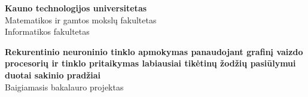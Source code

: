 

\begin{titlepage}
  \begin{center}


    \begin{figure}[H]
      \centering
    \end{figure}

    \vspace*{30pt}

    \fontXII
    \textbf{Kauno technologijos universitetas}\\
    Matematikos ir gamtos mokslų fakultetas\\
    Informatikos fakultetas

    \vspace*{80pt}

    \fontXVIII
	   \textbf{Rekurentinio neuroninio tinklo apmokymas panaudojant grafinį vaizdo procesorių ir tinklo pritaikymas labiausiai tikėtinų žodžių pasiūlymui duotai sakinio pradžiai}\\
     \fontXIV
     Baigiamasis bakalauro projektas\\

     \vspace*{40pt}

     \fontXII




\end{center}
\end{titlepage}
